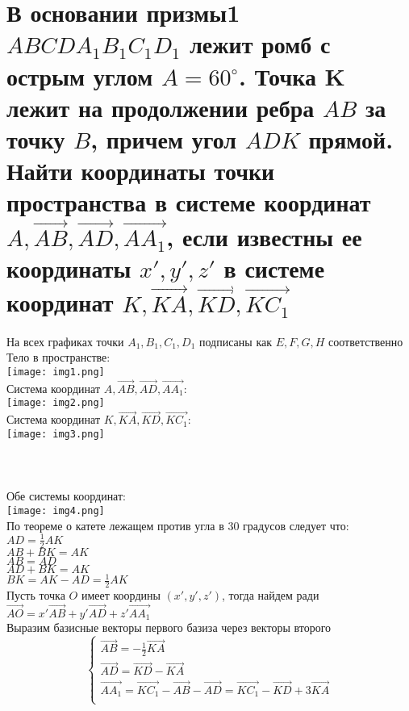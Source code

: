 \documentclass{article}
\begin{document}
\section{В основании призмы1 $ABCDA_1B_1C_1D_1$ лежит ромб с острым углом $A = 60^\circ$.
Точка K лежит на продолжении ребра $AB$ за точку $B$, причем угол $ADK$ прямой.
Найти координаты точки пространства в системе координат $A, \overrightarrow{AB}, \overrightarrow{AD}, \overrightarrow{AA_1}$, если
известны ее координаты $x', y', z'$ в системе координат $K, \overrightarrow{KA}, \overrightarrow{KD}, \overrightarrow{KC_1}$
}
    На всех графиках точки $A_1, B_1, C_1, D_1$ подписаны как $E, F, G, H$ соответственно \\
    Тело в пространстве: \\
    \texttt{[image: img1.png]} \\
    Система координат $A, \overrightarrow{AB}, \overrightarrow{AD}, \overrightarrow{AA_1}$: \\
    \texttt{[image: img2.png]} \\
    Система координат $K, \overrightarrow{KA}, \overrightarrow{KD}, \overrightarrow{KC_1}$: \\
    \texttt{[image: img3.png]} \\ \\ \\ \\
    Обе системы координат: \\
    \texttt{[image: img4.png]} \\
    По теореме о катете лежащем против угла в 30 градусов следует что: \\
    $AD = \frac{1}{2} AK$ \\
    $AB + BK = AK$ \\
    $AB = AD$ \\
    $AD + BK = AK$ \\
    $BK = AK - AD = \frac{1}{2} AK$ \\
    Пусть точка $O$ имеет координы $(x', y', z')$, тогда найдем ради
    $\overrightarrow{AO} = x' \overrightarrow{AB} + y' \overrightarrow{AD} + z' \overrightarrow{AA_1}$ \\
    Выразим базисные векторы первого базиза через векторы второго \\
    \begin{equation*}
        \begin{cases}
            \overrightarrow{AB} = - \frac{1}{2} \overrightarrow{KA} \\
            \overrightarrow{AD} = \overrightarrow{KD} - \overrightarrow{KA} \\
            \overrightarrow{AA_1} = \overrightarrow{KC_1} - \overrightarrow{AB} - \overrightarrow{AD} = \overrightarrow{KC_1} - \overrightarrow{KD} + 3 \overrightarrow{KA} \\
        \end{cases}
    \end{equation*}
\end{document}
